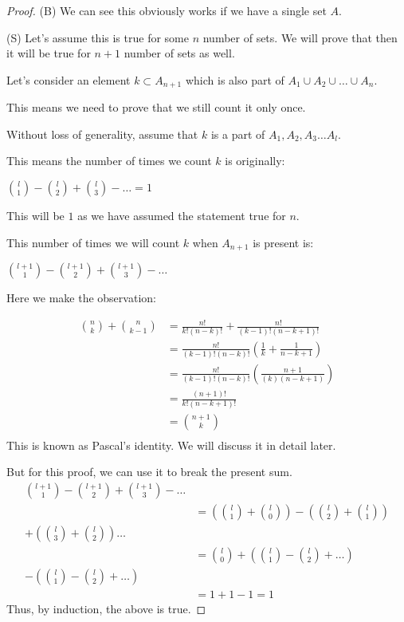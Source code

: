 \begin{proof}
    (B) We can see this obviously works if we have a single set $A$.\par
    (S) Let's assume this is true for some $n$ number of sets. We will prove that then it will be true for $n+1$ number of sets as well.\par
    Let's consider an element $k \subset A_{n+1}$ which is also part of $A_1 \cup A_2 \cup \dots \cup A_n$.\par
    This means we need to prove that we still count it only once.\par
    Without loss of generality, assume that $k$ is a part of $A_1, A_2, A_3 \dots A_l$.\par
    This means the number of times we count $k$ is originally:\par
    $\binom{l}{1}-\binom{l}{2}+\binom{l}{3}-\dots=1$\par
    This will be $1$ as we have assumed the statement true for $n$.\par
    This number of times we will count $k$ when $A_{n+1}$ is present is:\par
    $\binom{l+1}{1}-\binom{l+1}{2}+\binom{l+1}{3}-\dots$\par
    Here we make the observation:\par
    \begin{align*}
        \binom{n}{k}+\binom{n}{k-1} & = \frac{n!}{k!(n-k)!}+ \frac{n!}{(k-1)!(n-k+1)!}\\
        & = \frac{n!}{(k-1)!(n-k)!}\left( \frac{1}{k}+\frac{1}{n-k+1} \right)\\
        & = \frac{n!}{(k-1)!(n-k)!}\left( \frac{n+1}{(k)(n-k+1)} \right)\\
        & = \frac{(n+1)!}{k!(n-k+1)!}\\
        & = \binom{n+1}{k}\\
    \end{align*}
    This is known as Pascal's identity. We will discuss it in detail later.\par
    But for this proof, we can use it to break the present sum.
\begin{align*}
\binom{l+1}{1}-\binom{l+1}{2}+\binom{l+1}{3}-\dots & \\
&= \left(\binom{l}{1}+\binom{l}{0}\right)-\left(\binom{l}{2}+\binom{l}{1}\right)\\
+\left(\binom{l}{3}+\binom{l}{2}\right)\dots\\
&= \binom{l}{0}+\left( \binom{l}{1}-\binom{l}{2}+\dots \right)\\
-\left( \binom{l}{1}-\binom{l}{2}+\dots \right)\\
&= 1+1-1=1
\end{align*}
Thus, by induction, the above is true.
\end{proof}
